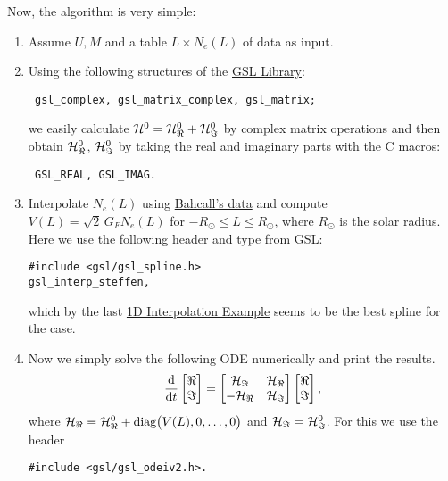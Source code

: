 \documentclass[a4paper,fleqn,12pt]{article}
\begin{document}
Now, the algorithm is very simple:
\begin{enumerate}

\item Assume $U, M$ and a table $L \times N_e(L)$ of data as input.

\item Using the following structures of the \href{https://www.gnu.org/software/gsl/doc/html/}{GSL Library}:
\begin{verbatim} gsl_complex, gsl_matrix_complex, gsl_matrix; \end{verbatim}
we easily calculate $\H^0 = \H^0_\real + \H^0_\imaginary$ by complex matrix operations and then obtain $\H^0_\real$, $\H^0_\imaginary$ by taking the real and imaginary parts with the C macros:
\begin{verbatim} GSL_REAL, GSL_IMAG. \end{verbatim}

\item Interpolate $N_e(L)$ using \href{http://www.sns.ias.edu/~jnb/SNdata/sndata.html}{Bahcall's data} and compute $V(L) = \sqrt{2} \, G_F N_e(L)$ for $-R_\odot \leq L \leq R_\odot$, where $R_\odot$ is the solar radius. Here we use the following header and type from GSL:
\begin{verbatim}
#include <gsl/gsl_spline.h>
gsl_interp_steffen,
\end{verbatim}
which by the last \href{https://www.gnu.org/software/gsl/doc/html/interp.html#d-interpolation-example-programs}{1D Interpolation Example} seems to be the best spline for the case.

\item Now we simply solve the following ODE numerically and print the results.
$$
\dv{}{t}
\begin{bmatrix}
\real \\ \imaginary
\end{bmatrix}
=
\begin{bmatrix}
\H_\imaginary & \H_\real \\
-\H_\real & \H_\imaginary
\end{bmatrix}
\begin{bmatrix}
\real \\ \imaginary
\end{bmatrix},
$$
where $\H_\real = \H^0_\real + \text{diag}\big(V(L), 0, \ldots, 0\big)$ and $\H_\imaginary = \H^0_\imaginary$. For this we use the header
\begin{verbatim}
#include <gsl/gsl_odeiv2.h>.
\end{verbatim}

\end{enumerate}
\end{document}
